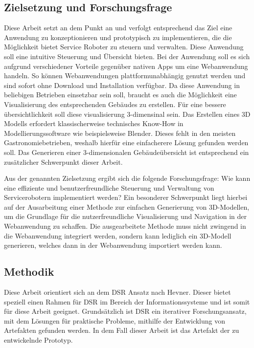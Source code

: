 \subsection{Zielsetzung und Forschungsfrage}
Diese Arbeit setzt an dem Punkt an und verfolgt entsprechend das Ziel eine Anwendung zu konzeptionieren und prototypisch zu implementieren, die die Möglichkeit bietet Service Roboter zu steuern und verwalten. Diese Anwendung soll eine intuitive Steuerung und Übersicht bieten. Bei der Anwendung soll es sich aufgrund verschiedener Vorteile gegenüber nativen Apps um eine Webanwendung handeln. So können Webanwendungen plattformunabhängig genutzt werden und sind sofort ohne Download und Installation verfügbar. Da diese Anwendung in beliebigen Betrieben einsetzbar sein soll, braucht es auch die Möglichkeit eine Visualisierung des entsprechenden Gebäudes zu erstellen. Für eine bessere übersichtlichkeit soll diese visualisierung 3-dimensinal sein. Das Erstellen eines 3D Modells erfordert klassischerweise technisches Know-How in Modellierungssoftware wie beispielsweise Blender. Dieses fehlt in den meisten Gastronomiebetrieben, weshalb hierfür eine einfacherere Lösung gefunden werden soll. Das Generieren einer 3-dimensionalen Gebäudeübersicht ist entsprechend ein zusätzlicher Schwerpunkt dieser Arbeit.


Aus der genannten Zielsetzung ergibt sich die folgende Forschungsfrage: Wie kann eine effiziente und benutzerfreundliche Steuerung und Verwaltung von Servicerobotern implementiert werden? Ein besonderer Schwerpunkt liegt hierbei auf der Ausarbeitung einer Methode zur einfachen Generierung von 3D-Modellen, um die Grundlage für die nutzerfreundliche Visualisierung und Navigation in der Webanwendung zu schaffen. Die ausgearbeitete Methode muss nicht zwingend in die Webanwendung integriert werden, sondern kann lediglich ein 3D-Modell generieren, welches dann in der Webanwendung importiert werden kann.


\subsection{Methodik}
Diese Arbeit orientiert sich an dem \ac{DSR} Ansatz nach Hevner. Dieser bietet speziell einen Rahmen für \ac{DSR} im Bereich der Informationssysteme und ist somit für diese Arbeit geeignet. Grundsätzlich ist \ac{DSR} ein iterativer Forschungsansatz, mit dem Lösungen für praktische Probleme, mithilfe der Entwicklung von Artefakten gefunden werden. In dem Fall dieser Arbeit ist das Artefakt der zu entwickelnde Prototyp. 

